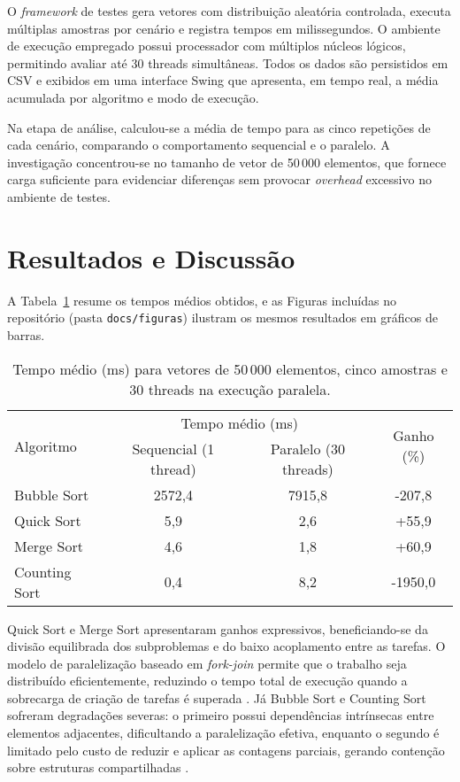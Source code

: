 \documentclass[11pt,twoside,a4paper]{article}
\begin{document}
\par O \textit{framework} de testes gera vetores com distribuição aleatória controlada, executa múltiplas amostras por cenário e registra tempos em milissegundos. O ambiente de execução empregado possui processador com múltiplos núcleos lógicos, permitindo avaliar até 30 threads simultâneas. Todos os dados são persistidos em CSV e exibidos em uma interface Swing que apresenta, em tempo real, a média acumulada por algoritmo e modo de execução.

\par Na etapa de análise, calculou-se a média de tempo para as cinco repetições de cada cenário, comparando o comportamento sequencial e o paralelo. A investigação concentrou-se no tamanho de vetor de 50\,000 elementos, que fornece carga suficiente para evidenciar diferenças sem provocar \textit{overhead} excessivo no ambiente de testes.

\section{Resultados e Discussão}
\par A Tabela~\ref{tab:resultados} resume os tempos médios obtidos, e as Figuras incluídas no repositório (pasta \texttt{docs/figuras}) ilustram os mesmos resultados em gráficos de barras.

\begin{table}[H]
    \centering
    \caption{Tempo médio (ms) para vetores de 50\,000 elementos, cinco amostras e 30 threads na execução paralela.}
    \label{tab:resultados}
    \begin{tabular}{lccc}
        \toprule
        \multirow{2}{*}{Algoritmo} & \multicolumn{2}{c}{Tempo médio (ms)} & \multirow{2}{*}{Ganho (\%)} \\
        \cmidrule(lr){2-3}
         & Sequencial (1 thread) & Paralelo (30 threads) &  \\
        \midrule
        Bubble Sort   & 2572,4 & 7915,8 & -207,8 \\
        Quick Sort    & 5,9    & 2,6    & +55,9 \\
        Merge Sort    & 4,6    & 1,8    & +60,9 \\
        Counting Sort & 0,4    & 8,2    & -1950,0 \\
        \bottomrule
    \end{tabular}
\end{table}

\par Quick Sort e Merge Sort apresentaram ganhos expressivos, beneficiando-se da divisão equilibrada dos subproblemas e do baixo acoplamento entre as tarefas. O modelo de paralelização baseado em \textit{fork-join} permite que o trabalho seja distribuído eficientemente, reduzindo o tempo total de execução quando a sobrecarga de criação de tarefas é superada \cite{mccool2012structured}. Já Bubble Sort e Counting Sort sofreram degradações severas: o primeiro possui dependências intrínsecas entre elementos adjacentes, dificultando a paralelização efetiva, enquanto o segundo é limitado pelo custo de reduzir e aplicar as contagens parciais, gerando contenção sobre estruturas compartilhadas \cite{herlihy2020art}.
\end{document}
